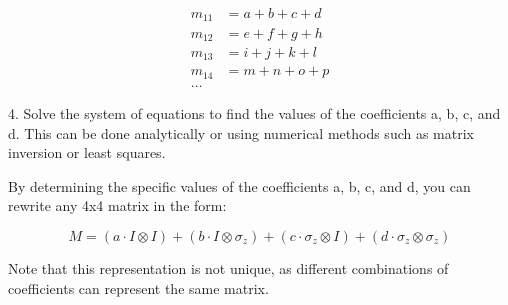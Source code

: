\documentclass[english,notitlepage,reprint,nofootinbib]{revtex4-1}
\begin{document}
\[
\begin{aligned}
m_{11} &= a + b + c + d \\
m_{12} &= e + f + g + h \\
m_{13} &= i + j + k + l \\
m_{14} &= m + n + o + p \\
\ldots
\end{aligned}
\]

4. Solve the system of equations to find the values of the coefficients a, b, c, and d. This can be done analytically or using numerical methods such as matrix inversion or least squares.

By determining the specific values of the coefficients a, b, c, and d, you can rewrite any 4x4 matrix in the form:

\[
M = (a \cdot I \otimes I) + (b \cdot I \otimes \sigma_z) + (c \cdot \sigma_z \otimes I) + (d \cdot \sigma_z \otimes \sigma_z)
\]

Note that this representation is not unique, as different combinations of coefficients can represent the same matrix.
\onecolumngrid

%

\end{document}
